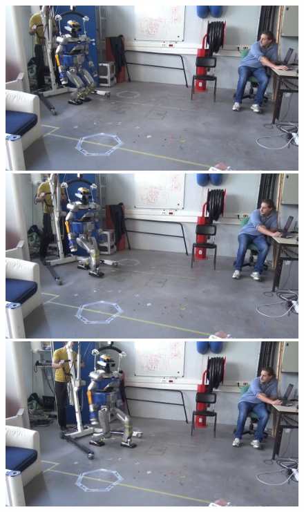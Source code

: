 
\begin{figure}[!ht]
  \begin{center}
  \includegraphics[trim={7.0cm 0.0cm 20.0cm 0.0cm}, clip, width=0.2\widthValue]
    {./fig/fastwalk1.jpeg}
  \includegraphics[trim={7.0cm 0.0cm 20.0cm 0.0cm}, clip, width=0.2\widthValue]
    {./fig/fastwalk2.jpeg}
  \includegraphics[trim={7.0cm 0.0cm 20.0cm 0.0cm}, clip, width=0.2\widthValue]
    {./fig/fastwalk3.jpeg}

\end{center}
\end{figure}
